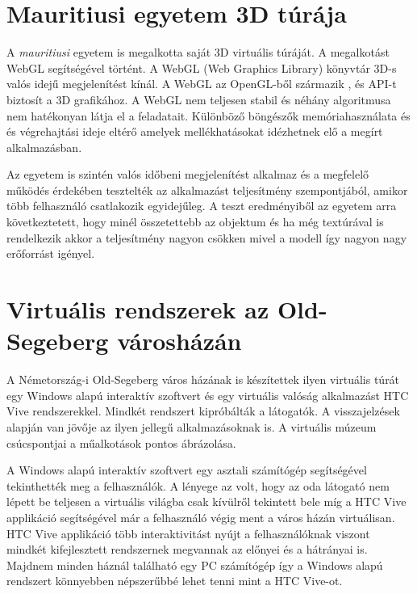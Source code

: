 \section{Mauritiusi egyetem 3D túrája}
 
 A {\textit{mauritiusi}\footnotemark} egyetem \cite{moloo20163d} is megalkotta saját 3D virtuális túráját. A megalkotást WebGL segítségével történt. A WebGL (Web Graphics Library) könyvtár 3D-s valós idejű megjelenítést kínál. A WebGL az OpenGL-ből származik , és API-t biztosít a 3D grafikához.  A WebGL nem teljesen stabil  és néhány algoritmusa nem hatékonyan látja el a feladatait. Különböző böngészők memóriahasználata és és végrehajtási ideje eltérő amelyek mellékhatásokat idézhetnek elő a megírt alkalmazásban.


Az egyetem is szintén valós időbeni megjelenítést alkalmaz és a megfelelő működés érdekében tesztelték az alkalmazást teljesítmény szempontjából, amikor több felhasználó csatlakozik egyidejűleg.  A teszt eredményiből az egyetem arra következtetett, hogy minél összetettebb az objektum és ha még textúrával is rendelkezik akkor a teljesítmény nagyon csökken mivel a modell így nagyon nagy erőforrást igényel. 

\section{Virtuális rendszerek az Old-Segeberg városházán}

A Németország-i Old-Segeberg \cite{kersten2017development} város házának is készítettek ilyen virtuális túrát egy Windows alapú interaktív szoftvert és egy virtuális valóság alkalmazást HTC Vive rendszerekkel. Mindkét rendszert kipróbálták a látogatók. A visszajelzések alapján van jövője az ilyen jellegű alkalmazásoknak is. A virtuális múzeum csúcspontjai a műalkotások pontos ábrázolása. 

A Windows alapú interaktív szoftvert egy asztali számítógép segítségével tekinthették meg a felhasználók. A lényege az volt, hogy az oda látogató nem lépett be teljesen a virtuális világba csak kívülről tekintett bele míg a HTC Vive applikáció segítségével már a felhasználó végig ment a város házán virtuálisan. HTC Vive applikáció több interaktivitást nyújt a felhasználóknak viszont mindkét kifejlesztett rendszernek megvannak az előnyei és a hátrányai is. Majdnem minden háznál található egy PC számítógép így a Windows alapú rendszert könnyebben népszerűbbé lehet tenni mint a HTC Vive-ot.

